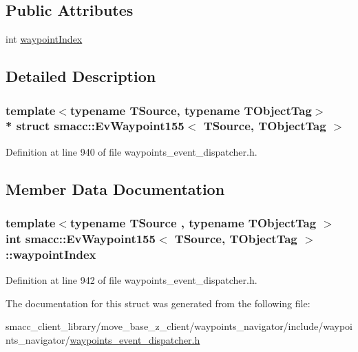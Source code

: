 \subsection*{Public Attributes}
\begin{DoxyCompactItemize}
\item 
int \hyperlink{structsmacc_1_1EvWaypoint155_a89fc9ceb7955725a74c13c0152dde637}{waypoint\+Index}
\end{DoxyCompactItemize}


\subsection{Detailed Description}
\subsubsection*{template$<$typename T\+Source, typename T\+Object\+Tag$>$\\*
struct smacc\+::\+Ev\+Waypoint155$<$ T\+Source, T\+Object\+Tag $>$}



Definition at line 940 of file waypoints\+\_\+event\+\_\+dispatcher.\+h.



\subsection{Member Data Documentation}
\subsubsection[{\texorpdfstring{waypoint\+Index}{waypointIndex}}]{\setlength{\rightskip}{0pt plus 5cm}template$<$typename T\+Source , typename T\+Object\+Tag $>$ int {\bf smacc\+::\+Ev\+Waypoint155}$<$ T\+Source, T\+Object\+Tag $>$\+::waypoint\+Index}\hypertarget{structsmacc_1_1EvWaypoint155_a89fc9ceb7955725a74c13c0152dde637}{}\label{structsmacc_1_1EvWaypoint155_a89fc9ceb7955725a74c13c0152dde637}


Definition at line 942 of file waypoints\+\_\+event\+\_\+dispatcher.\+h.



The documentation for this struct was generated from the following file\+:\begin{DoxyCompactItemize}
\item 
smacc\+\_\+client\+\_\+library/move\+\_\+base\+\_\+z\+\_\+client/waypoints\+\_\+navigator/include/waypoints\+\_\+navigator/\hyperlink{waypoints__event__dispatcher_8h}{waypoints\+\_\+event\+\_\+dispatcher.\+h}\end{DoxyCompactItemize}
